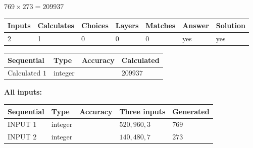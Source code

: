 \documentclass{ctexart}
\begin{document}
 
 
 
\noindent{}
 
 

$ %
769 \times  %
273=   %
209937$
 
 
\noindent{}
 
 

 
   
   
   
   
\noindent\begin{tabular}{|l|l|l|l|l|l|l|}
 \hline
Inputs & Calculates & Choices & Layers & Matches & Answer & Solution \\ \hline
 2  & 
 1  & 
 0
  & 
 0  & 
 0  & 
  yes & 
  yes 
  \\ \hline
 \end{tabular}
   
   
   
   
\noindent{}
   
   
  
  
\noindent\begin{tabular}{|l|l|l|l|}
\hline
 Sequential & Type & Accuracy & Calculated \\ 
\hline
 
 
  Calculated $  1 $ & integer &  & 
  $ 209937 $ 
 \\  \hline  
 \end{tabular}
   
   
   
   
\noindent\vspace{0.1in}\hspace{-0.08in} {\textbf{\Large{All inputs: }}}
   
   
  
  
\noindent\begin{tabular}{|l|l|l|l|l|}
\hline
 Sequential & Type & Accuracy & Three inputs & Generated \\ 
\hline
 
 
  INPUT $  1 $ & integer &  & $
 520
 , 
 960
 , 
 3
 $ & $ 769 $ 
 \\  \hline  
 
 
  INPUT $  2 $ & integer &  & $
 140
 , 
 480
 , 
 7
 $ & $ 273 $ 
 \\  \hline  
 \end{tabular}
   
\end{document}
